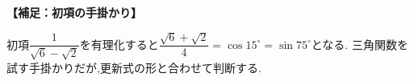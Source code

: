   \medskip
  \noindent \textbf{【補足：初項の手掛かり】}

  初項$\dfrac{1}{\sqrt6-\sqrt2}$を有理化すると$\dfrac{\sqrt6+\sqrt2}{4}=\cos15^\circ=\sin75^\circ$となる.
  三角関数を試す手掛かりだが,更新式の形と合わせて判断する.
  \par
\endgroup


